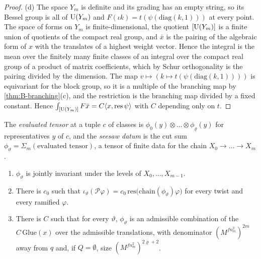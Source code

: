 \begin{proof}
(d) The space $Y_m$ is definite and its grading has an empty string, so its Bessel group is all of $\operatorname{U}(Y_m)$ and $F(\iota k)=t(\psi(\mathrm{diag}(k,1)))$ at every point. The space of forms on $Y_m$ is finite-dimensional, the quotient $[\operatorname{U}(Y_m)]$ is a finite union of quotients of the compact real group, and $\bar x$ is the pairing of the algebraic form of $x$ with the
translates of a highest weight vector. Hence the integral is the mean over the finitely many finite classes of an integral over the compact real group of a product of matrix coefficients, which by Schur orthogonality is the pairing divided by the dimension. The map $v\mapsto(k\mapsto t(\psi(\mathrm{diag}(k,1))))$ is equivariant for the block group, so it is a
multiple of the branching map by \cref{thm:B-branching}(c), and the restriction is the branching map divided by a fixed constant. Hence $\int_{[\operatorname{U}(Y_m)]}F\bar x=C\langle x,\mathrm{res}\,\psi\rangle$ with $C$ depending only on $t$.
\end{proof}

The \emph{evaluated tensor} at a tuple $c$ of classes is $\phi_0(y)\otimes\dots\otimes\phi_\varrho(y)$ for representatives $y$ of $c$, and the
\emph{seesaw datum} is the cut sum $\phi_\vartheta=\Sigma_m(\text{evaluated tensor})$, a tensor of finite data for the chain
$X_0\to\dots\to X_m$.

\begin{proposition}\label{prop:seesaw-datum}
\begin{enumerate}[label=\textup{(\alph*)}]
\item $\phi_\vartheta$ is jointly invariant under the levels of $X_0,\dots,X_{m-1}$.
\item There is $c_0$ such that $\iota_\vartheta(\mathcal P\varphi)=c_0\,\mathrm{res}\bigl(\mathrm{chain}(\phi_\vartheta)\varphi\bigr)$ for every twist and every ramified
$\varphi$.
\item There is $C$ such that for every $\vartheta$, $\phi_\vartheta$ is an admissible combination of the $C\,\mathrm{Glue}(x)$ over the admissible
translations, with denominator $(M^{fn_m^2})^{2m}$ away from $q$ and, if $Q=\emptyset$, size $(M^{fn_m^2})^{2\varrho+2}$.
\end{enumerate}
\end{proposition}

